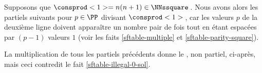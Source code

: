 Supposons que $\consprod<1> = n(n+1) \in \NNssquare$\,. Nous avons alors les \sftab[x] partiels suivants pour $p \in \PP$ divisant $\consprod<1>$\,, car les valeurs $p$ de la deuxième ligne doivent apparaître un nombre pair de fois tout en étant espacées par $(p-1)$ valeurs $1$ (voir les faits \ref{sftable-multiple} et \ref{sftable-parity-square}).

\begin{center}
\end{center}


La multiplication de tous les \sftab[x] partiels précédents donne le \sftab, non partiel, ci-après, mais ceci contredit le fait \ref{sftable-illegal-0-sol}.

\begin{center}
\end{center}
